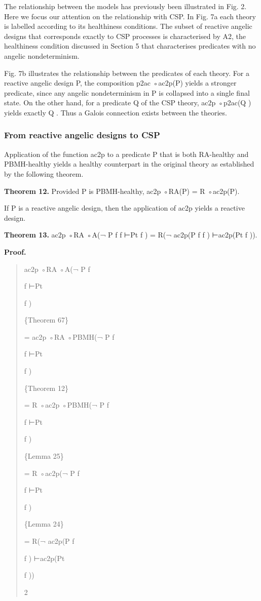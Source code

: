 \documentclass[11pt]{article}
\begin{document}
The relationship between the models has previously been illustrated in Fig. 2. Here we focus our attention on the relationship with CSP. In Fig. 7a each theory is labelled according to its healthiness conditions. The subset of reactive angelic designs that corresponds exactly to CSP processes is characterised by A2, the healthiness condition discussed in Section 5 that characterises predicates with no angelic nondeterminism.

Fig. 7b illustrates the relationship between the predicates of each theory. For a reactive angelic design P, the composition p2ac ◦ac2p(P) yields a stronger predicate, since any angelic nondeterminism in P is collapsed into a single final state. On the other hand, for a predicate Q of the CSP theory, ac2p ◦p2ac(Q ) yields exactly Q . Thus a Galois connection exists between the theories.

\subsubsection{From reactive angelic designs to CSP}
Application of the function ac2p to a predicate P that is both RA-healthy and PBMH-healthy yields a healthy counterpart in the original theory as established by the following theorem.

\noindent\textbf{Theorem 12.} Provided P is PBMH-healthy, ac2p ◦RA(P) = R ◦ac2p(P).


If P is a reactive angelic design, then the application of ac2p yields a reactive design.

\noindent\textbf{Theorem 13.} ac2p ◦RA ◦A(¬ P f f ⊢Pt f ) = R(¬ ac2p(P f f ) ⊢ac2p(Pt f )).


\noindent\textbf{Proof.}


\begin{quote}\small\raggedright
ac2p ◦RA ◦A(¬ P f
\par
f ⊢Pt
\par
f )
\par
\{Theorem 67\}
\par
= ac2p ◦RA ◦PBMH(¬ P f
\par
f ⊢Pt
\par
f )
\par
\{Theorem 12\}
\par
= R ◦ac2p ◦PBMH(¬ P f
\par
f ⊢Pt
\par
f )
\par
\{Lemma 25\}
\par
= R ◦ac2p(¬ P f
\par
f ⊢Pt
\par
f )
\par
\{Lemma 24\}
\par
= R(¬ ac2p(P f
\par
f ) ⊢ac2p(Pt
\par
f ))
\par
2
\end{quote}
\end{document}
